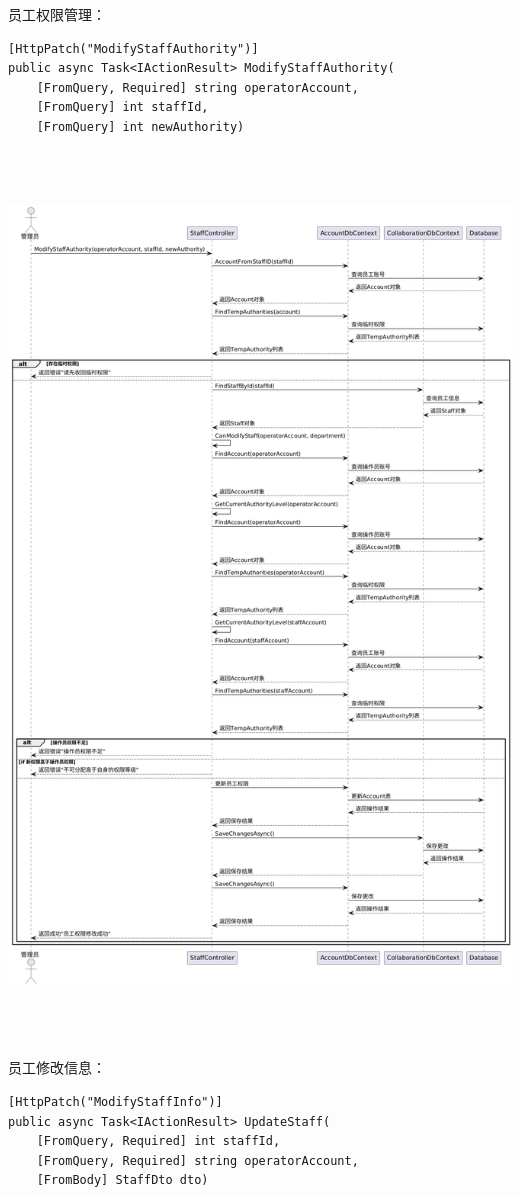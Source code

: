 \documentclass[]{article}
\begin{document}
员工权限管理：
\begin{verbatim}
[HttpPatch("ModifyStaffAuthority")]
public async Task<IActionResult> ModifyStaffAuthority(
    [FromQuery, Required] string operatorAccount,
    [FromQuery] int staffId,
    [FromQuery] int newAuthority)
\end{verbatim}

\includegraphics[width=5.98403in,height=9.26389in]{media/media/image16.png}

员工修改信息：
\begin{verbatim}
[HttpPatch("ModifyStaffInfo")]
public async Task<IActionResult> UpdateStaff(
    [FromQuery, Required] int staffId,
    [FromQuery, Required] string operatorAccount,
    [FromBody] StaffDto dto)
\end{verbatim}
\end{document}
